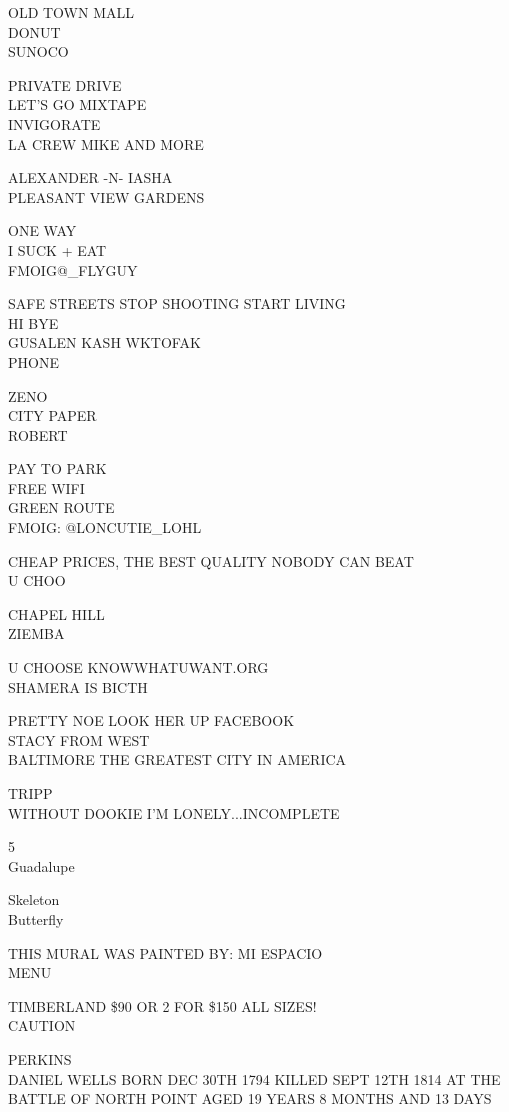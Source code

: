 \documentclass[10pt,letterpaper]{article}
\begin{document}
OLD TOWN MALL\\
DONUT\\
SUNOCO

PRIVATE DRIVE\\
LET'S GO MIXTAPE\\
INVIGORATE\\
LA CREW MIKE AND MORE

ALEXANDER {-}N{-} IASHA\\
PLEASANT VIEW GARDENS

ONE WAY\\
I SUCK + EAT\\
FMOIG@\_FLYGUY

SAFE STREETS STOP SHOOTING START LIVING\\
HI BYE\\
GUSALEN KASH WKTOFAK\\
PHONE

ZENO\\
CITY PAPER\\
ROBERT

PAY TO PARK\\
FREE WIFI\\
GREEN ROUTE\\
FMOIG: @LONCUTIE\_LOHL

CHEAP PRICES, THE BEST QUALITY NOBODY CAN BEAT\\
U CHOO

CHAPEL HILL\\
ZIEMBA

U CHOOSE KNOWWHATUWANT.ORG\\
SHAMERA IS BICTH

PRETTY NOE LOOK HER UP FACEBOOK\\
STACY FROM WEST\\
BALTIMORE THE GREATEST CITY IN AMERICA

TRIPP\\
WITHOUT DOOKIE I'M LONELY...INCOMPLETE

5\\
Guadalupe

Skeleton\\
Butterfly

THIS MURAL WAS PAINTED BY: MI ESPACIO\\
MENU

TIMBERLAND \$90 OR 2 FOR \$150 ALL SIZES!\\
CAUTION

PERKINS\\
DANIEL WELLS BORN DEC 30TH 1794 KILLED SEPT 12TH 1814 AT THE BATTLE OF NORTH POINT AGED 19 YEARS 8 MONTHS AND 13 DAYS
\end{document}
